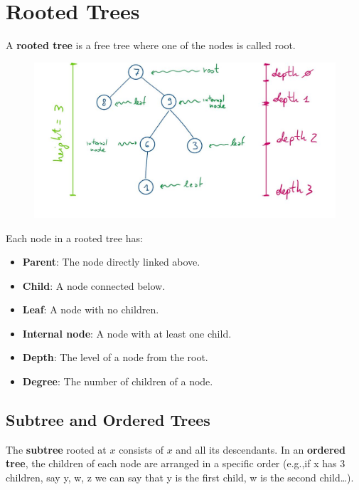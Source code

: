 \section{Rooted Trees}
A \textbf{rooted tree} is a free tree where one of the nodes is called root.

    
\begin{figure}[h]
        \centering
        \includegraphics[width=0.5\linewidth]{immagini/rooated tree.JPG}
    \end{figure}



Each node in a rooted tree has:
\begin{itemize}
    \item \textbf{Parent}: The node directly linked above.
    \item \textbf{Child}: A node connected below.
    \item \textbf{Leaf}: A node with no children.
    \item \textbf{Internal node}: A node with at least one child.
    \item \textbf{Depth}: The level of a node from the root.
    \item \textbf{Degree}: The number of children of a node.
\end{itemize}

\subsection{Subtree and Ordered Trees}
The \textbf{subtree} rooted at \( x \) consists of \( x \) and all its descendants. In an \textbf{ordered tree}, the children of each node are arranged in a specific order (e.g.,if x has 3 children, say {y, w, z} we can say that y is the first child, w is the second child…).

